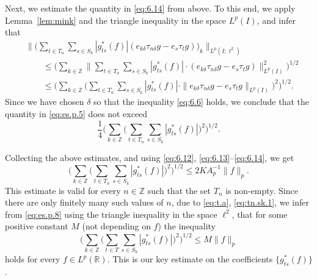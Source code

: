 \documentclass[reqno,a4paper,12pt]{amsart}
\numberwithin{equation}{section}
\numberwithin{figure}{section}
\newcommand\R{\mathbb{R}}
\newcommand\Z{\mathbb{Z}}
\newcommand\1{\mathds{1}}
\newcommand{\TTT}{T}
\newcommand{\SSS}{S}
\newcommand{\ts}{\tau}
\renewcommand\le{\leqslant}
\theoremstyle{plain}
\newcommand{\lemref}[1]{Lemma~\ref{#1}}
\theoremstyle{definition}
\begin{document}
Next, we  estimate the quantity in \eqref{eq:6.14} from above. To this end,
 we apply \lemref{lem:mink} and the triangle inequality in the space $L^p(I)$, and infer that 
\begin{align}
&\Big\| \Big( \sum_{t\in \TTT_n}  \sum_{s\in \SSS_k} 
 |g_{ts}^*(f)| (e_{k\delta} \ts_{n\delta}g -e_s \ts_t g )\Big)_k \Big\|_{L^p(I;\ell^2)}\\
&\qquad \le \Big( \sum_{k\in\Z} \Big\| \sum_{t\in \TTT_n}  \sum_{s\in \SSS_k} 
 |g_{ts}^*(f)| \cdot (e_{k\delta} \ts_{n\delta} g - e_s \ts_t g) \Big\|^2_{L^p(I)} \Big)^{1/2}\\
& \qquad \le \Big( \sum_{k\in\Z} \Big( \sum_{t\in \TTT_n}  \sum_{s\in \SSS_k} 
 |g_{ts}^*(f)|\cdot \|e_{k\delta} \ts_{n\delta}g - e_s \ts_t g\|_{L^p(I)} \Big)^2 \Big)^{1/2}. \label{eq:es.p.5}
\end{align}
Since we have chosen $\delta$ so that the inequality \eqref{eq:6.6} holds, we conclude that 
the  quantity in \eqref{eq:es.p.5} does not exceed
\begin{equation}
\frac{1}{4}\Big( \sum_{k\in\Z} \Big(
\sum_{t\in \TTT_n}  \sum_{s\in \SSS_k} 
|g_{ts}^*(f)| \Big)^2 \Big)^{1/2}.
\end{equation}

Collecting the above estimates, and using \eqref{eq:6.12},
 \eqref{eq:6.13}--\eqref{eq:6.14}, we get
\begin{equation}
\label{eq:es.p.8}
\Big( \sum_{k\in\Z} \Big( 
\sum_{t\in \TTT_n}  \sum_{s\in \SSS_k} 
|g_{ts}^*(f)| \Big)^2 \Big)^{1/2}\le 2K A_p^{-1} \|f\|_p.
\end{equation}
This estimate is valid for every $n \in \Z$ such that the set
$\TTT_n$ is non-empty. Since there are only finitely many
such values of $n$, due to 
\eqref{eq:t.a}, \eqref{eq:tn.sk.1},
we infer from \eqref{eq:es.p.8}
using the triangle inequality in the space $\ell^2$,
that for some positive constant $M$ 
(not depending  on $f$) the inequality
\begin{equation}
\label{eq:keyest}
\Big( \sum_{k\in\Z} \Big( \sum_{t\in \TTT} \sum_{s\in \SSS_k}
|g_{ts}^*(f)| \Big)^2 \Big)^{1/2}\le M \|f\|_p
\end{equation}
holds for every $f \in L^p(\R)$. 
This is our key estimate on the coefficients $\{g_{ts}^*(f)\}$.
\end{document}
